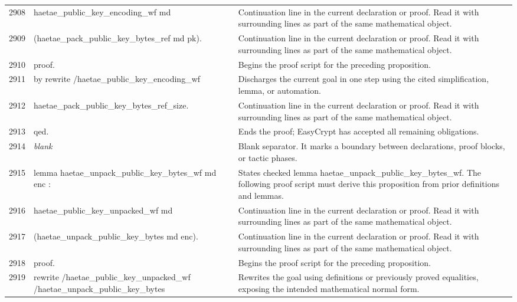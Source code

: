 \documentclass[10pt]{article}
\begin{document}
\begin{longtable}{r L{0.53\textwidth} L{0.37\textwidth}}
2908 & {\ttfamily\scriptsize   haetae\_public\_key\_encoding\_wf md} & Continuation line in the current declaration or proof.  Read it with surrounding lines as part of the same mathematical object. \\
2909 & {\ttfamily\scriptsize     (haetae\_pack\_public\_key\_bytes\_ref md pk).} & Continuation line in the current declaration or proof.  Read it with surrounding lines as part of the same mathematical object. \\
2910 & {\ttfamily\scriptsize proof.} & Begins the proof script for the preceding proposition. \\
2911 & {\ttfamily\scriptsize by rewrite /haetae\_public\_key\_encoding\_wf} & Discharges the current goal in one step using the cited simplification, lemma, or automation. \\
2912 & {\ttfamily\scriptsize            haetae\_pack\_public\_key\_bytes\_ref\_size.} & Continuation line in the current declaration or proof.  Read it with surrounding lines as part of the same mathematical object. \\
2913 & {\ttfamily\scriptsize qed.} & Ends the proof; EasyCrypt has accepted all remaining obligations. \\
2914 & {\ttfamily\scriptsize \emph{blank}} & Blank separator.  It marks a boundary between declarations, proof blocks, or tactic phases. \\
2915 & {\ttfamily\scriptsize lemma haetae\_unpack\_public\_key\_bytes\_wf md enc :} & States checked lemma haetae\_unpack\_public\_key\_bytes\_wf.  The following proof script must derive this proposition from prior definitions and lemmas. \\
2916 & {\ttfamily\scriptsize   haetae\_public\_key\_unpacked\_wf md} & Continuation line in the current declaration or proof.  Read it with surrounding lines as part of the same mathematical object. \\
2917 & {\ttfamily\scriptsize     (haetae\_unpack\_public\_key\_bytes md enc).} & Continuation line in the current declaration or proof.  Read it with surrounding lines as part of the same mathematical object. \\
2918 & {\ttfamily\scriptsize proof.} & Begins the proof script for the preceding proposition. \\
2919 & {\ttfamily\scriptsize rewrite /haetae\_public\_key\_unpacked\_wf /haetae\_unpack\_public\_key\_bytes} & Rewrites the goal using definitions or previously proved equalities, exposing the intended mathematical normal form. \\

\end{longtable}
\end{document}
